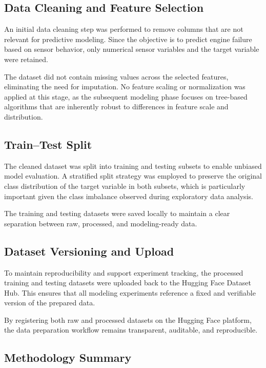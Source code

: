 \documentclass[11pt,a4paper]{article}
\begin{document}
\subsection{Data Cleaning and Feature Selection}

An initial data cleaning step was performed to remove columns that are not relevant for predictive modeling. Since the objective is to predict engine failure based on sensor behavior, only numerical sensor variables and the target variable were retained.

The dataset did not contain missing values across the selected features, eliminating the need for imputation. No feature scaling or normalization was applied at this stage, as the subsequent modeling phase focuses on tree-based algorithms that are inherently robust to differences in feature scale and distribution.

\subsection{Train--Test Split}

The cleaned dataset was split into training and testing subsets to enable unbiased model evaluation. A stratified split strategy was employed to preserve the original class distribution of the target variable in both subsets, which is particularly important given the class imbalance observed during exploratory data analysis.

The training and testing datasets were saved locally to maintain a clear separation between raw, processed, and modeling-ready data.

\subsection{Dataset Versioning and Upload}

To maintain reproducibility and support experiment tracking, the processed training and testing datasets were uploaded back to the Hugging Face Dataset Hub. This ensures that all modeling experiments reference a fixed and verifiable version of the prepared data.

By registering both raw and processed datasets on the Hugging Face platform, the data preparation workflow remains transparent, auditable, and reproducible.

\subsection*{Methodology Summary}
\end{document}
